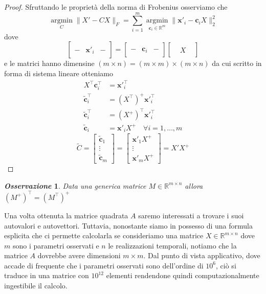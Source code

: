 \documentclass[11pt]{article}
\newtheorem{oss}{\textit{Osservazione}}
\newcommand{\R}{\mathbb{R}}
\begin{document}
\begin{proof} 
Sfruttando le proprietà della norma di Frobenius osserviamo che 
\[ \operatorname*{argmin}_{C}{\|X' -C X\|_F} = \sum_{i=1}^m \operatorname*{argmin}_{\mathbf{c}_i \in \R^m} \|\mathbf{x'}_i - \mathbf{c}_iX\|_2^2 
\]
dove 
\[
\begin{bmatrix}
&& \\
-& \mathbf{x'}_i & - \\
&&
\end{bmatrix}=\begin{bmatrix}
&& \\
-& \mathbf{c}_i & - \\
&&
\end{bmatrix}\begin{bmatrix}
 & &  \\
& X & \\
& &
\end{bmatrix}
\]
e le matrici hanno dimensine \((m\times n)=(m\times m)\times (m\times n)\)
da cui scritto in forma di sistema lineare otteniamo
\begin{align*}
X^\top \mathbf{c}_i^\top &= \mathbf{x'}_i^\top \\
\mathbf{\tilde{c}}_i^\top &= (X^\top)^+ \mathbf{x'}_i^\top \\
\mathbf{\tilde{c}}_i^\top &= (X^+)^\top \mathbf{x'}_i^\top \\
\mathbf{\tilde{c}}_i &=\mathbf{x'}_i X^+  \quad \forall i = 1, \dots,m
\end{align*}
\[ 
\tilde{C}=\begin{bmatrix}
\mathbf{\tilde{c}}_1 \\ \vdots \\ \mathbf{\tilde{c}}_m
\end{bmatrix}= \begin{bmatrix}
\mathbf{x'}_1X^+ \\ \vdots \\ \mathbf{x'}_mX^+
\end{bmatrix}=X'X^+
\]
\end{proof}
\begin{oss}
Data una generica matrice \(M \in \R^{m \times n} \) allora \( (M^+)^\top=(M^\top)^+ \)
\end{oss}
Una volta ottenuta la matrice quadrata $A$ saremo interessati a trovare i suoi autovalori e autovettori. 
Tuttavia, nonostante siamo in possesso di una formula esplicita che ci permette calcolarla se consideriamo una matrice $X \in \mathbb{R}^{m \times n}$ dove $m$ sono i parametri osservati e $n$ le realizzazioni temporali, notiamo che la matrice $A$ dovrebbe avere dimensioni $m \times m$. Dal punto di vista applicativo, dove accade di frequente che i parametri osservati sono dell'ordine di $10^6$, ciò si traduce in una matrice con $10^{12}$ elementi rendendone quindi computazionalmente ingestibile il calcolo.
\end{document}
